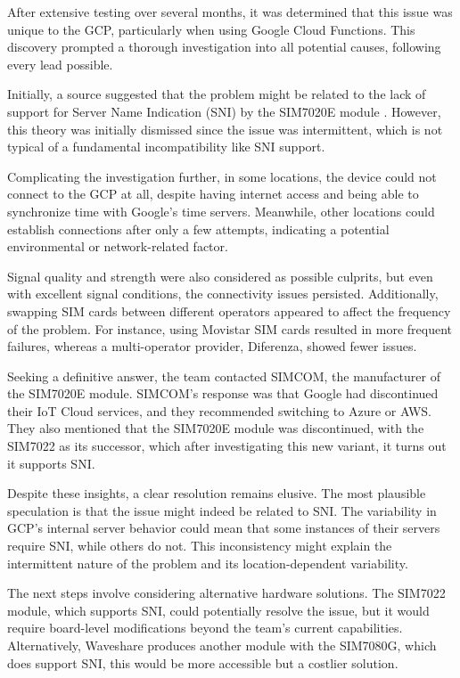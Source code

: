 After extensive testing over several months, it was determined that this issue was unique to the 
GCP, particularly when using Google Cloud Functions. This discovery prompted a thorough 
investigation into all potential causes, following every lead possible.

Initially, a source suggested that the problem might be related to the lack of support for Server 
Name Indication (SNI) by the SIM7020E module \cite{sim7020e_chttpconerror}. However, this theory 
was initially dismissed since the issue was intermittent, which is not typical of a fundamental 
incompatibility like SNI support.

Complicating the investigation further, in some locations, the device could not connect to the GCP 
at all, despite having internet access and being able to synchronize time with Google's time 
servers. Meanwhile, other locations could establish connections after only a few attempts, 
indicating a potential environmental or network-related factor.

Signal quality and strength were also considered as possible culprits, but even with excellent 
signal conditions, the connectivity issues persisted. Additionally, swapping SIM cards between 
different operators appeared to affect the frequency of the problem. For instance, using Movistar 
SIM cards resulted in more frequent failures, whereas a multi-operator provider, Diferenza, showed 
fewer issues.

Seeking a definitive answer, the team contacted SIMCOM, the manufacturer of the SIM7020E module. 
SIMCOM's response was that Google had discontinued their IoT Cloud services, and they recommended 
switching to Azure or AWS. They also mentioned that the SIM7020E module was discontinued, with the 
SIM7022 as its successor, which after investigating this new variant, it turns out it supports SNI.

Despite these insights, a clear resolution remains elusive. The most plausible speculation is that 
the issue might indeed be related to SNI. The variability in GCP's internal server behavior could 
mean that some instances of their servers require SNI, while others do not. This inconsistency 
might explain the intermittent nature of the problem and its location-dependent variability.

The next steps involve considering alternative hardware solutions. The SIM7022 module, which 
supports SNI, could potentially resolve the issue, but it would require board-level modifications 
beyond the team's current capabilities. Alternatively, Waveshare produces another module with the 
SIM7080G, which does support SNI, this would be more accessible but a costlier solution.
